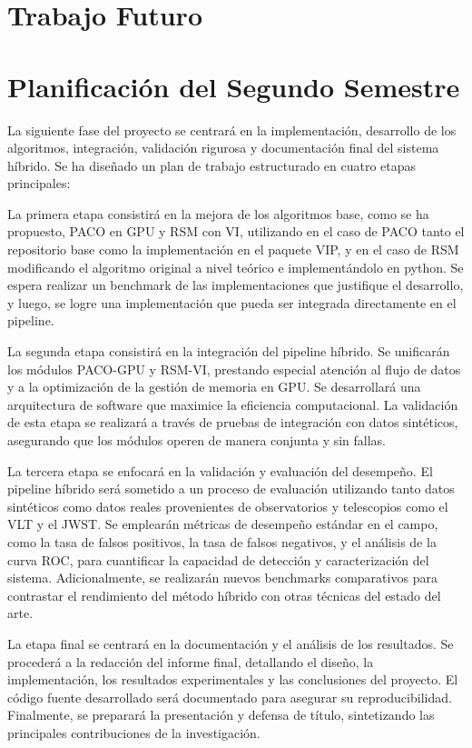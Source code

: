 \section{Trabajo Futuro}
\section{Planificación del Segundo Semestre}
\label{sec:planificacion}

La siguiente fase del proyecto se centrará en la implementación, desarrollo de los algoritmos, integración, validación rigurosa y documentación final del sistema híbrido. Se ha diseñado un plan de trabajo estructurado en cuatro etapas principales:

La primera etapa consistirá en la mejora de los algoritmos base, como se ha propuesto, PACO en GPU y RSM con VI, utilizando en el caso de PACO tanto el repositorio base como la implementación en el paquete VIP, y en el caso de RSM modificando el algoritmo original a nivel teórico e implementándolo en python. Se espera realizar un benchmark de las implementaciones que justifique el desarrollo, y luego, se logre una implementación que pueda ser integrada directamente en el pipeline.

La segunda etapa consistirá en la integración del pipeline híbrido. Se unificarán los módulos PACO-GPU y RSM-VI, prestando especial atención al flujo de datos y a la optimización de la gestión de memoria en GPU. Se desarrollará una arquitectura de software que maximice la eficiencia computacional. La validación de esta etapa se realizará a través de pruebas de integración con datos sintéticos, asegurando que los módulos operen de manera conjunta y sin fallas.

La tercera  etapa se enfocará en la validación y evaluación del desempeño. El pipeline híbrido será sometido a un proceso de evaluación utilizando tanto datos sintéticos como datos reales provenientes de observatorios y telescopios como el VLT y el JWST. Se emplearán métricas de desempeño estándar en el campo, como la tasa de falsos positivos, la tasa de falsos negativos, y el análisis de la curva ROC, para cuantificar la capacidad de detección y caracterización del sistema. Adicionalmente, se realizarán nuevos benchmarks comparativos para contrastar el rendimiento del método híbrido con otras técnicas del estado del arte.

La etapa final se centrará en la documentación y el análisis de los resultados. Se procederá a la redacción del informe final, detallando el diseño, la implementación, los resultados experimentales y las conclusiones del proyecto. El código fuente desarrollado será documentado para asegurar su reproducibilidad. Finalmente, se preparará la presentación y defensa de título, sintetizando las principales contribuciones de la investigación.


